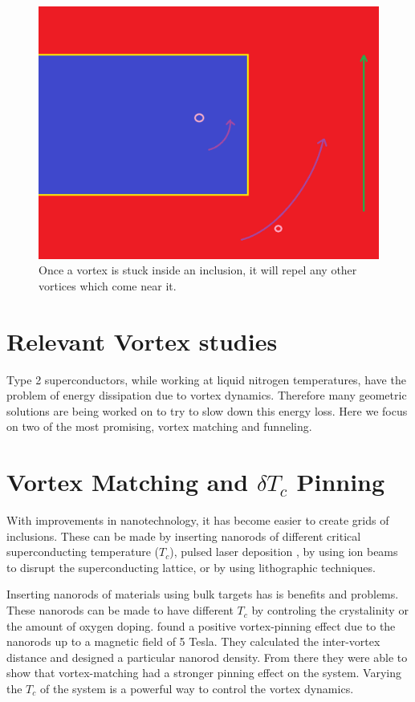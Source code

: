\begin{figure}[htbp]
\begin{center}
\includegraphics[scale=.50]{repulsion.png}
\caption{Once a vortex is stuck inside an inclusion, it will repel any other vortices which come near it.}
\label{repulsion}
\end{center}
\end{figure}

\section{Relevant Vortex studies}

Type 2 superconductors, while working at liquid nitrogen temperatures, have the problem of energy dissipation due to vortex dynamics. Therefore many geometric solutions are being worked on to try to slow down this energy loss. Here we focus on two of the most promising, vortex matching and funneling.

\section{Vortex Matching and $\delta T_c$ Pinning}
With improvements in nanotechnology, it has become easier to create grids of inclusions. These can be made by inserting nanorods of different critical superconducting temperature ($T_c$), pulsed laser deposition , by using ion beams to disrupt the superconducting lattice, or by using lithographic techniques.

Inserting nanorods of materials using bulk targets has is benefits and problems. These nanorods can be made to have different $T_c$ by controling the crystalinity or the amount of oxygen doping. \cite{Horii15} found a positive vortex-pinning effect due to the nanorods up to a magnetic field of 5 Tesla. They calculated the inter-vortex distance and designed a particular nanorod density. From there they were able to show that vortex-matching had a stronger pinning effect on the system. Varying the $T_c$ of the system is a powerful way to control the vortex dynamics.

